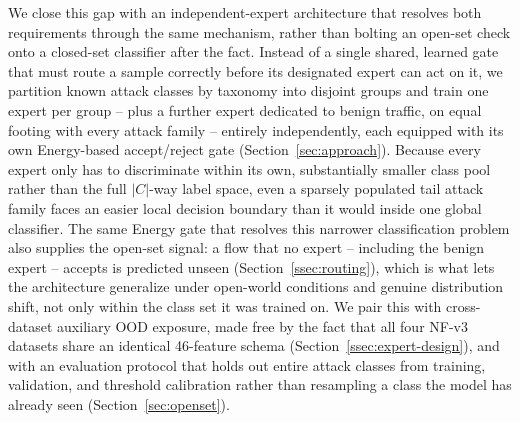 \documentclass[sigconf]{acmart}
\begin{document}
We close this gap with an independent-expert architecture that resolves both requirements through the same mechanism, rather than bolting an open-set check onto a closed-set classifier after the fact. Instead of a single shared, learned gate that must route a sample correctly before its designated expert can act on it, we partition known attack classes by taxonomy into disjoint groups and train one expert per group -- plus a further expert dedicated to benign traffic, on equal footing with every attack family -- entirely independently, each equipped with its own Energy-based accept/reject gate \citep{liu2020energy} (Section~\ref{sec:approach}). Because every expert only has to discriminate within its own, substantially smaller class pool rather than the full $|C|$-way label space, even a sparsely populated tail attack family faces an easier local decision boundary than it would inside one global classifier. The same Energy gate that resolves this narrower classification problem also supplies the open-set signal: a flow that no expert -- including the benign expert -- accepts is predicted unseen (Section~\ref{ssec:routing}), which is what lets the architecture generalize under open-world conditions and genuine distribution shift, not only within the class set it was trained on. We pair this with cross-dataset auxiliary OOD exposure, made free by the fact that all four NF-v3 datasets share an identical 46-feature schema (Section~\ref{ssec:expert-design}), and with an evaluation protocol that holds out entire attack classes from training, validation, and threshold calibration rather than resampling a class the model has already seen (Section~\ref{sec:openset}).
\end{document}
